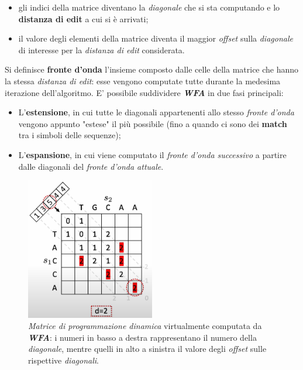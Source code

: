     \begin{itemize}
        \item gli indici della matrice diventano la \emph{diagonale} che si sta computando e lo \textbf{distanza di edit} a cui si è arrivati;
        \item il valore degli elementi della matrice diventa il maggior \emph{offset} sulla \emph{diagonale} di interesse per la \emph{distanza di edit} considerata.
    \end{itemize}
    Si definisce \textbf{fronte d'onda} l'insieme composto dalle celle della matrice che hanno la stessa \emph{distanza di edit}: esse vengono computate tutte durante la medesima iterazione dell'algoritmo. E' possibile suddividere \textbf{\textit{WFA}} in due fasi principali:
    \begin{itemize}
        \item L'\textbf{estensione}, in cui tutte le diagonali appartenenti allo stesso \emph{fronte d'onda} vengono appunto "estese" il più possibile (fino a quando ci sono dei \textbf{match} tra i simboli delle sequenze); 
        \item L'\textbf{espansione}, in cui viene computato il \emph{fronte d'onda successivo} a partire dalle diagonali del \emph{fronte d'onda attuale}.
    \end{itemize}
    
    \begin{figure}[h]
        \centering
        \includegraphics[width=0.5\textwidth]{images/wfa_partial_matrix.png}
        \caption{\emph{Matrice di programmazione dinamica} virtualmente computata da \textbf{\textit{WFA}}: i numeri in basso a destra rappresentano il numero della \emph{diagonale}, mentre quelli in alto a sinistra il valore degli \emph{offset} sulle rispettive \emph{diagonali}. \cite{wfa_sequence_graph}}
        \label{fig:wfa_partial_matrix}
    \end{figure}
    \vspace{20pt}

